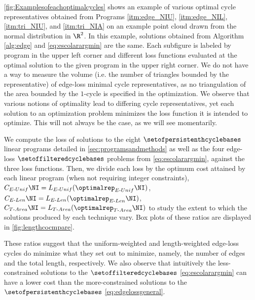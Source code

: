 \fig \ref{fig:Examplesofeachoptimalcycles} shows an example of various optimal cycle representatives obtained from Programs
\ref{itm:edge_NIU},
\ref{itm:edge_NIL},
\ref{itm:tri_NIU}, and
\ref{itm:tri_NIA}
on an example point cloud drawn from the normal distribution in $\R^2$. In this example, solutions obtained from Algorithm \ref{alg:edge} and \pr \eqref{eq:escolarargmin} are the same. Each subfigure is labeled by program in the upper left corner and different loss functions evaluated at the optimal solution to the given program in the upper right corner. We do not have a way to measure the volume (i.e. the number of triangles bounded by the representative) of edge-loss minimal cycle representatives, as no triangulation of the area bounded by the $1$-cycle is specified in the optimization. We observe that various notions of optimality lead to differing cycle representatives, yet each solution to an optimization problem minimizes the loss function it is intended to optimize. This will not always be the case, as we will see momentarily.

We compute the loss of solutions to the eight $\setofpersistenthcyclebases$ linear programs detailed in \se \ref{sec:programsandmethods} as well as the four edge-loss $\setoffilteredcyclebases$ problems from \pr \eqref{eq:escolarargmin}, against the three loss functions. Then, we divide each loss by the optimum cost attained by each linear program (when not requiring integer constraints), $C_{E\text{-}Unif}\NI=L_{E\text{-}Unif}(\optimalrep_{E\text{-}Unif}\NI)$, $C_{E\text{-}Len}\NI=L_{E\text{-}Len}(\optimalrep_{E\text{-}Len}\NI)$, $C_{T\text{-}Area}\NI=L_{T\text{-}Area}(\optimalrep_{T\text{-}Area}\NI)$ to study the extent to which the solutions produced by each technique vary.  %
Box plots of these ratios are displayed in \fig\ref{fig:lengthcocmpare}. 




These ratios suggest that the uniform-weighted and length-weighted edge-loss cycles do minimize what they set out to minimize, namely, the number of edges and the total length, respectively. We also observe that intuitively the less-constrained solutions to the $\setoffilteredcyclebases$ \pr \eqref{eq:escolarargmin} can have a lower cost than the more-constrained solutions to the $\setofpersistenthcyclebases$ \pr \eqref{eq:edgelossgeneral}. 
 
